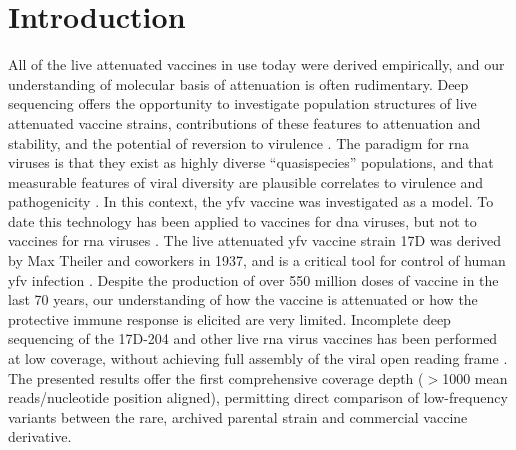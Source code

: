 \section{Introduction}
All of the live attenuated vaccines in use today were derived empirically, and our understanding of molecular basis of attenuation is often rudimentary. Deep sequencing offers the opportunity to investigate population structures of live attenuated vaccine strains, contributions of these features to attenuation and stability, and the potential of reversion to virulence \parencite{Neverov:2010ko,Kennedy:2011ff,Luciani:2012em}. The paradigm for \gls{rna} viruses is that they exist as highly diverse ``quasispecies'' populations, and that measurable features of viral diversity are plausible correlates to virulence and pathogenicity \parencite{Vignuzzi:2006ju,Holland:1992cq}. In this context, the \gls{yfv} vaccine was investigated as a model. To date this technology has been applied to vaccines for \gls{dna} viruses, but not to vaccines for \gls{rna} viruses \parencite{Szpara:2011gg}. The live attenuated \gls{yfv} vaccine strain 17D was derived by Max Theiler and coworkers in 1937, and is a critical tool for control of human \gls{yfv} infection \parencite{Theiler:1937wy}. Despite the production of over 550 million doses of vaccine in the last 70 years, our understanding of how the vaccine is attenuated or how the protective immune response is elicited are very limited. Incomplete deep sequencing of the 17D-204 and other live \gls{rna} virus vaccines has been performed at low coverage, without achieving full assembly of the viral open reading frame \parencite{Victoria:2010kf}. The presented results offer the first comprehensive coverage depth ($>$1000 mean reads/nucleotide position aligned), permitting direct comparison of low-frequency variants between the rare, archived parental strain and commercial vaccine derivative. 

